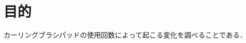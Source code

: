 \documentclass[main]{subfiles}
\begin{document}
\chapter{目的}
カーリングブラシパッドの使用回数によって起こる変化を調べることである．\cite{ref:mnih2013playing}
\end{document}
